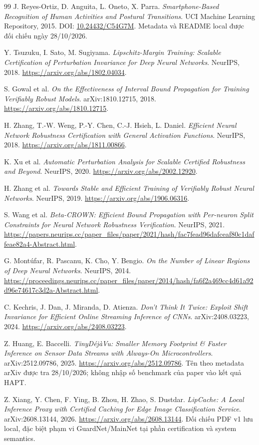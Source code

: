 \documentclass[11pt,a4paper]{article}
\theoremstyle{remark}
\begin{document}
\begin{thebibliography}{99}
 J. Reyes-Ortiz, D. Anguita, L. Oneto, X. Parra.
\emph{Smartphone-Based Recognition of Human Activities and Postural
Transitions}. UCI Machine Learning Repository, 2015.
DOI: \href{https://doi.org/10.24432/C54G7M}{10.24432/C54G7M}.
Metadata và README local được đối chiếu ngày 28/10/2026.

 Y. Tsuzuku, I. Sato, M. Sugiyama.
\emph{Lipschitz-Margin Training: Scalable Certification of Perturbation
Invariance for Deep Neural Networks}. NeurIPS, 2018.
\url{https://arxiv.org/abs/1802.04034}.

 S. Gowal et al.
\emph{On the Effectiveness of Interval Bound Propagation for Training
Verifiably Robust Models}. arXiv:1810.12715, 2018.
\url{https://arxiv.org/abs/1810.12715}.

 H. Zhang, T.-W. Weng, P.-Y. Chen, C.-J. Hsieh, L. Daniel.
\emph{Efficient Neural Network Robustness Certification with General
Activation Functions}. NeurIPS, 2018.
\url{https://arxiv.org/abs/1811.00866}.

 K. Xu et al.
\emph{Automatic Perturbation Analysis for Scalable Certified Robustness
and Beyond}. NeurIPS, 2020.
\url{https://arxiv.org/abs/2002.12920}.

 H. Zhang et al.
\emph{Towards Stable and Efficient Training of Verifiably Robust Neural
Networks}. NeurIPS, 2019.
\url{https://arxiv.org/abs/1906.06316}.

 S. Wang et al.
\emph{Beta-CROWN: Efficient Bound Propagation with Per-neuron Split
Constraints for Neural Network Robustness Verification}. NeurIPS, 2021.
\url{https://papers.neurips.cc/paper_files/paper/2021/hash/fac7fead96dafceaf80c1daffeae82a4-Abstract.html}.

 G. Mont\'ufar, R. Pascanu, K. Cho, Y. Bengio.
\emph{On the Number of Linear Regions of Deep Neural Networks}.
NeurIPS, 2014.
\url{https://proceedings.neurips.cc/paper_files/paper/2014/hash/fa6f2a469cc4d61a92d96e74617c3d2a-Abstract.html}.

 C. Kechris, J. Dan, J. Miranda, D. Atienza.
\emph{Don't Think It Twice: Exploit Shift Invariance for Efficient Online
Streaming Inference of CNNs}. arXiv:2408.03223, 2024.
\url{https://arxiv.org/abs/2408.03223}.

 Z. Huang, E. Baccelli.
\emph{TinyD\'ej\`aVu: Smaller Memory Footprint \& Faster Inference on Sensor
Data Streams with Always-On Microcontrollers}. arXiv:2512.09786, 2025.
\url{https://arxiv.org/abs/2512.09786}. Tên theo metadata arXiv được tra
28/10/2026; không nhập số benchmark của paper vào kết quả HAPT.

 Z. Xiang, Y. Chen, F. Ying, B. Zhou, H. Zhao, S. Dustdar.
\emph{LipCache: A Local Inference Proxy with Certified Caching for Edge
Image Classification Service}. arXiv:2608.13144, 2026.
\url{https://arxiv.org/abs/2608.13144}. Đối chiếu PDF v1 lưu local,
đặc biệt phạm vi GuardNet/MainNet tại phần certification và system semantics.
\end{thebibliography}
\end{document}
